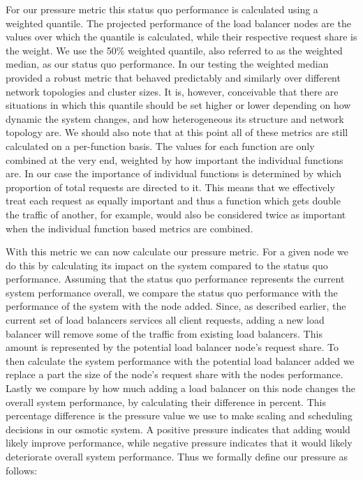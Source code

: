 \documentclass[draft,final]{vutinfth} %
\begin{document}
For our pressure metric this status quo performance is calculated using a weighted quantile.
The projected performance of the load balancer nodes are the values over which the quantile is calculated, while their respective request share is the weight.
We use the 50\% weighted quantile, also referred to as the weighted median, as our status quo performance.
In our testing the weighted median provided a robust metric that behaved predictably and similarly over different network topologies and cluster sizes.
It is, however, conceivable that there are situations in which this quantile should be set higher or lower depending on how dynamic the system changes, and how heterogeneous its structure and network topology are.
We should also note that at this point all of these metrics are still calculated on a per-function basis.
The values for each function are only combined at the very end, weighted by how important the individual functions are.
In our case the importance of individual functions is determined by which proportion of total requests are directed to it.
This means that we effectively treat each request as equally important and thus a function which gets double the traffic of another, for example, would also be considered twice as important when the individual function based metrics are combined.

With this metric we can now calculate our pressure metric. For a given node we do this by calculating its impact on the system compared to the status quo performance.
Assuming that the status quo performance represents the current system performance overall, we compare the status quo performance with the performance of the system with the node added.
Since, as described earlier, the current set of load balancers services all client requests, adding a new load balancer will remove some of the traffic from existing load balancers.
This amount is represented by the potential load balancer node's request share.
To then calculate the system performance with the potential load balancer added we replace a part the size of the node's request share with the nodes performance.
Lastly we compare by how much adding a load balancer on this node changes the overall system performance, by calculating their difference in percent.
This percentage difference is the pressure value we use to make scaling and scheduling decisions in our osmotic system.
A positive pressure indicates that adding would likely improve performance, while negative pressure indicates that it would likely deteriorate overall system performance.
Thus we formally define our pressure as follows:
\end{document}
